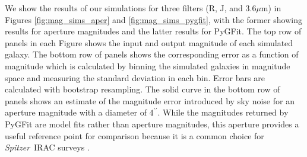\documentclass[preprint]{aastex}
\newcommand{\pygfit}{PyGFit}
\newcommand{\spitzer}{{\it Spitzer}}
\begin{document}
We show the results of our simulations for three filters (R, J, and $3.6\mu$m) in Figures \ref{fig:mag_sims_aper} and \ref{fig:mag_sims_pygfit}, with the former showing results for aperture magnitudes and the latter results for \pygfit{}.  The top row of panels in each Figure shows the input and output magnitude of each simulated galaxy.  The bottom row of panels shows the corresponding error as a function of magnitude which is calculated by binning the simulated galaxies in magnitude space and measuring the standard deviation in each bin.  Error bars are calculated with bootstrap resampling.  The solid curve in the bottom row of panels shows an estimate of the magnitude error introduced by sky noise for an aperture magnitude with a diameter of $4^{\prime\prime}$.  %
While the magnitudes returned by \pygfit{} are model fits rather than aperture magnitudes, this aperture provides a useful reference point for comparison because it is a common choice for \spitzer\ IRAC surveys \citep{eisenhardt2004,ashby2013}.
\end{document}
